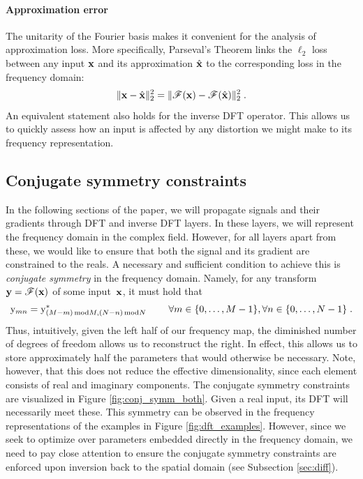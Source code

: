 \documentclass{article} %
\begin{document}
\paragraph{Approximation error} The unitarity of the Fourier basis makes it convenient for the analysis of approximation loss. More specifically, Parseval's Theorem links the $\ell_2$ loss between any input $\boldsymbol{\mathrm{x}}$ and its approximation $\hat{\boldsymbol{\mathrm{x}}}$ to the corresponding loss in the frequency domain:
\begin{align}
\|\boldsymbol{\mathrm{x}} - \hat{\boldsymbol{\mathrm{x}}}\|_2^2 = \|\mathscr{F}(\boldsymbol{\mathrm{x}}) - \mathscr{F}(\hat{\boldsymbol{\mathrm{x}}})\|_2^2\;.
\label{eqn:parseval}
\end{align}
An equivalent statement also holds for the inverse DFT operator. This allows us to quickly assess how an input is affected by any distortion we might make to its frequency representation.

\subsection{Conjugate symmetry constraints}
\label{sec:conj_symm}
In the following sections of the paper, we will propagate signals and their gradients through DFT and inverse DFT layers. In these layers, we will represent the frequency domain in the complex field. However, for all layers apart from these, we would like to ensure that both the signal and its gradient are constrained to the reals.  A necessary and sufficient condition to achieve this is \emph{conjugate symmetry} in the frequency domain. Namely, for any transform~${\boldsymbol{\mathrm{y}}=\mathscr{F}(\boldsymbol{\mathrm{x}})}$ of some input~$\boldsymbol{\mathrm{x}}$, it must hold that
\begin{align}
\mathrm{y}_{mn} = \mathrm{y}^*_{(M - m)\,\textrm{mod} M, (N - n)\,\textrm{mod} N}\;\qquad \forall m\in\{0,\ldots,M-1\}, \forall n\in\{0,\ldots, N-1\}\;. 
\label{eqn:conj_symm}
\end{align}
Thus, intuitively, given the left half of our frequency map, the diminished number of degrees of freedom allows us to reconstruct the right.  In effect, this allows us to store approximately half the parameters that would otherwise be necessary.  Note, however, that this does not reduce the effective dimensionality, since each element consists of real and imaginary components. The conjugate symmetry constraints are visualized in Figure \ref{fig:conj_symm_both}. Given a real input, its DFT will necessarily meet these. This symmetry can be observed in the frequency representations of the examples in Figure \ref{fig:dft_examples}. However, since we seek to optimize over parameters embedded directly in the frequency domain, we need to pay close attention to ensure the conjugate symmetry constraints are enforced upon inversion back to the spatial domain (see Subsection \ref{sec:diff}).
\end{document}
